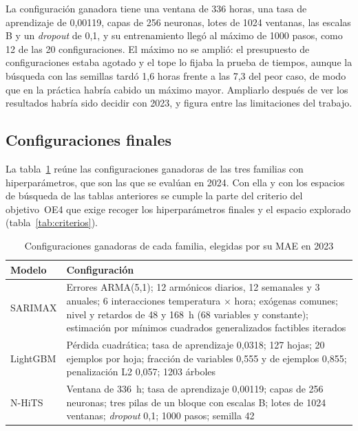La configuración ganadora tiene una ventana de 336 horas, una tasa de
aprendizaje de 0,00119, capas de 256 neuronas, lotes de 1024 ventanas, las
escalas B y un \textit{dropout} de 0,1, y su entrenamiento llegó al máximo
de 1000 pasos, como 12 de las 20 configuraciones. El máximo no se amplió: el
presupuesto de configuraciones estaba agotado y el tope lo fijaba la prueba
de tiempos, aunque la búsqueda con las semillas tardó 1,6 horas frente a las
7,3 del peor caso, de modo que en la práctica habría cabido un
máximo mayor. Ampliarlo después de ver los resultados habría sido decidir con
2023, y figura entre las limitaciones del trabajo.

\subsection{Configuraciones finales}\label{sec:esp-finales}

La tabla~\ref{tab:configuraciones} reúne las configuraciones ganadoras de las
tres familias con hiperparámetros, que son las que se evalúan en 2024. Con
ella y con los espacios de búsqueda de las tablas anteriores se cumple la
parte del criterio del objetivo~OE4 que exige recoger los hiperparámetros
finales y el espacio explorado (tabla~\ref{tab:criterios}).

\begin{table}[htbp]
	\centering
	\caption{Configuraciones ganadoras de cada familia, elegidas por su MAE en 2023}
	\label{tab:configuraciones}
	\small
	\begin{tabularx}{\textwidth}{>{\raggedright\arraybackslash}p{2.2cm} >{\raggedright\arraybackslash}X}
		\hline
		\textbf{Modelo} & \textbf{Configuración} \\
		\hline
		SARIMAX & Errores ARMA(5,1); 12 armónicos diarios, 12 semanales y 3 anuales; 6 interacciones temperatura $\times$ hora; exógenas comunes; nivel y retardos de 48 y 168~h (68 variables y constante); estimación por mínimos cuadrados generalizados factibles iterados \\
		LightGBM & Pérdida cuadrática; tasa de aprendizaje 0,0318; 127 hojas; 20 ejemplos por hoja; fracción de variables 0,555 y de ejemplos 0,855; penalización L2 0,057; 1203 árboles \\
		N-HiTS & Ventana de 336~h; tasa de aprendizaje 0,00119; capas de 256 neuronas; tres pilas de un bloque con escalas B; lotes de 1024 ventanas; \textit{dropout} 0,1; 1000 pasos; semilla 42 \\
		\hline
	\end{tabularx}
\end{table}

